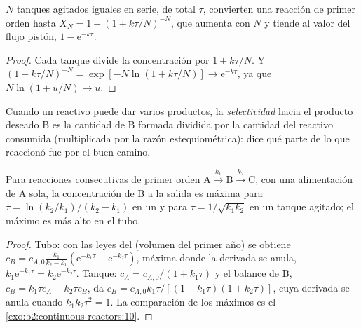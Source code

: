 \begin{proposition}\label{prop:b2:continuous-reactors:cascade}
$N$ tanques agitados iguales en serie, de  total $\tau$, convierten una
reacción de primer orden hasta $X_N = 1 - (1 + k\tau/N)^{-N}$, que aumenta con
$N$ y tiende al valor del flujo pistón, $1 - \mathrm e^{-k\tau}$.
\end{proposition}

\begin{proof}
Cada tanque divide la concentración por $1 + k\tau/N$. Y $(1 +
k\tau/N)^{-N} = \exp[-N\ln(1 + k\tau/N)] \to \mathrm e^{-k\tau}$, ya que
$N\ln(1 + u/N) \to u$.
\end{proof}

\begin{definition}[Selectividad]\label{def:b2:continuous-reactors:selectivity}
Cuando un reactivo puede dar varios productos, la \emph{selectividad}
hacia el producto deseado B es la cantidad de B formada dividida por la cantidad del
reactivo consumida (multiplicada por la razón estequiométrica): dice qué parte de
lo que reaccionó fue por el buen camino.
\end{definition}

\begin{proposition}\label{prop:b2:continuous-reactors:consecutive}
Para reacciones consecutivas de primer orden $\mathrm A \xrightarrow{k_1} \mathrm B
\xrightarrow{k_2} \mathrm C$, con una alimentación de A sola, la concentración de B
a la salida es máxima para $\tau = \ln(k_2/k_1)/(k_2 - k_1)$ en un
 y para $\tau = 1/\sqrt{k_1k_2}$ en un tanque agitado; el
máximo es más alto en el tubo.
\end{proposition}

\begin{proof}
Tubo: con las leyes del  (volumen del primer año) se obtiene $c_B = c_{A,0}\frac{k_1}{k_2 - k_1}
(\mathrm e^{-k_1\tau} - \mathrm e^{-k_2\tau})$, máxima donde la derivada
se anula, $k_1\mathrm e^{-k_1\tau} = k_2\mathrm e^{-k_2\tau}$. Tanque: $c_A =
c_{A,0}/(1 + k_1\tau)$ y el balance de B, $c_B = k_1\tau c_A - k_2\tau c_B$,
da $c_B = c_{A,0}k_1\tau/[(1 + k_1\tau)(1 + k_2\tau)]$, cuya derivada
se anula cuando $k_1k_2\tau^2 = 1$. La comparación de los máximos es el
\cref{exo:b2:continuous-reactors:10}.
\end{proof}

